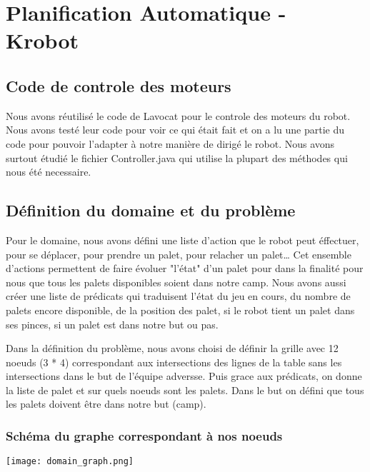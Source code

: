 \documentclass[11pt]{article}
\author{TheSpyGeek}
\date{\today}
\title{}
\begin{document}
\tableofcontents

\section{Planification Automatique - Krobot}
\label{sec:org6e342d7}

\subsection{Code de controle des moteurs}
\label{sec:org4705e8b}

   Nous avons réutilisé le code de Lavocat pour le controle des moteurs du robot.
Nous avons testé leur code pour voir ce qui était fait et on a lu une partie du code pour pouvoir
l'adapter à notre manière de dirigé le robot. Nous avons surtout étudié le fichier Controller.java
qui utilise la plupart des méthodes qui nous été necessaire.

\subsection{Définition du domaine et du problème}
\label{sec:orge1280cd}

Pour le domaine, nous avons défini une liste d'action que le robot peut éffectuer,
pour se déplacer, pour prendre un palet, pour relacher un palet\ldots{} 
Cet ensemble d'actions permettent de faire évoluer "l'état" d'un palet 
pour dans la finalité pour nous que tous les palets disponibles soient 
dans notre camp. Nous avons aussi créer une liste de prédicats qui 
traduisent l'état du jeu en cours, du nombre de palets encore disponible, 
de la position des palet, si le robot tient un palet dans ses pinces, 
si un palet est dans notre but ou pas.

Dans la définition du problème, nous avons choisi de définir la grille avec 12 noeuds (3 * 4) 
correspondant aux intersections des lignes de la table sans les intersections dans le but de l'équipe
adversse. Puis grace aux prédicats, on donne la liste de palet et sur quels noeuds sont les palets.
Dans le but on défini que tous les palets doivent être dans notre but (camp).

\subsubsection{Schéma du graphe correspondant à nos noeuds}
\label{sec:org64dc98f}
\begin{center}
\texttt{[image: domain\_graph.png]}
\end{center}
\end{document}
